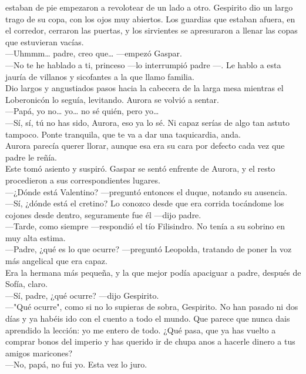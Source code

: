 \documentclass[
  letterpaper,
]{krantz}
\begin{document}
estaban de pie empezaron a revolotear de un lado a otro. Gespirito dio
un largo trago de su copa, con los ojos muy abiertos. Los guardias que
estaban afuera, en el corredor, cerraron las puertas, y los sirvientes
se apresuraron a llenar las copas que estuvieran vacías.\\
---Uhmmm\ldots{} padre, creo que\ldots{} ---empezó Gaspar.\\
---No te he hablado a ti, princeso ---lo interrumpió padre ---. Le hablo
a esta jauría de villanos y sicofantes a la que llamo familia.\\
Dio largos y angustiados pasos hacia la cabecera de la larga mesa
mientras el Loberonicón lo seguía, levitando. Aurora se volvió a
sentar.\\
---Papá, yo no\ldots{} yo\ldots{} no sé quién, pero yo\ldots{}\\
---Sí, sí, tú no has sido, Aurora, eso ya lo sé. Ni capaz serías de algo
tan astuto tampoco. Ponte tranquila, que te va a dar una taquicardia,
anda.\\
Aurora parecía querer llorar, aunque esa era su cara por defecto cada
vez que padre le reñía.\\
Este tomó asiento y suspiró. Gaspar se sentó enfrente de Aurora, y el
resto procedieron a sus correspondientes lugares.\\
---¿Dónde está Valentino? ---preguntó entonces el duque, notando su
ausencia.\\
---Sí, ¿dónde está el cretino? Lo conozco desde que era corrida
tocándome los cojones desde dentro, seguramente fue él ---dijo padre.\\
---Tarde, como siempre ---respondió el tío Filisindro. No tenía a su
sobrino en muy alta estima.\\
---Padre, ¿qué es lo que ocurre? ---preguntó Leopolda, tratando de poner
la voz más angelical que era capaz.\\
Era la hermana más pequeña, y la que mejor podía apaciguar a padre,
después de Sofía, claro.\\
---Sí, padre, ¿qué ocurre? ---dijo Gespirito.\\
---"Qué ocurre", como si no lo supieras de sobra, Gespirito. No han
pasado ni dos días y ya habéis ido con el cuento a todo el mundo. Que
parece que nunca dais aprendido la lección: yo me entero de todo. ¿Qué
pasa, que ya has vuelto a comprar bonos del imperio y has querido ir de
chupa anos a hacerle dinero a tus amigos maricones?\\
---No, papá, no fui yo. Esta vez lo juro.\\
\end{document}
